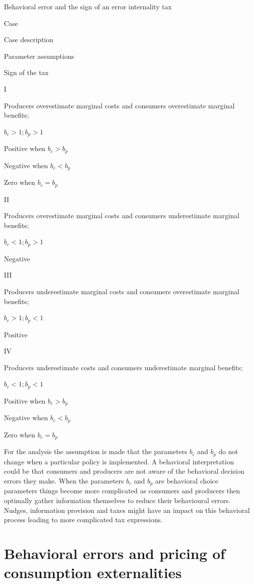 \documentclass[
]{book}
\begin{document}
\label{tab:beherror}Behavioral error and the sign of an error internality tax

Case

Case description

Parameter assumptions

Sign of the tax

I

Producers overestimate marginal costs and consumers overestimate marginal benefits;

\(b_c>1; b_p>1\)

Positive when \(b_c>b_p\)

Negative when \(b_c<b_p\)

Zero when \(b_c=b_p\)

II

Producers overestimate marginal costs and consumers underestimate marginal benefits;

\(b_c<1; b_p>1\)

Negative

III

Producers underestimate marginal costs and consumers overestimate marginal benefits;

\(b_c>1; b_p<1\)

Positive

IV

Producers underestimate costs and consumers underestimate marginal benefits;

\(b_c<1; b_p<1\)

Positive when \(b_c>b_p\)

Negative when \(b_c<b_p\)

Zero when \(b_c=b_p\)

For the analysis the assumption is made that the parameters \(b_c\) and \(b_p\) do not change when a particular policy is implemented. A behavioral interpretation could be that consumers and producers are not aware of the behavioral decision errors they make. When the parameters \(b_c\) and \(b_p\) are behavioral choice parameters things become more complicated as consumers and producers then optimally gather information themselves to reduce their behavioural errors. Nudges, information provision and taxes might have an impact on this behavioral process leading to more complicated tax expressions.

\hypertarget{behavioral-errors-and-pricing-of-consumption-externalities}{%
\section{Behavioral errors and pricing of consumption externalities}\label{behavioral-errors-and-pricing-of-consumption-externalities}}
\end{document}
